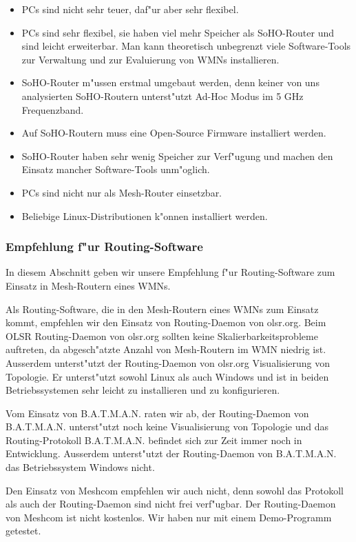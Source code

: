 \begin{itemize}
\item PCs sind nicht sehr teuer, daf"ur aber sehr flexibel.
\item PCs sind sehr flexibel, sie haben viel mehr Speicher als SoHO-Router
und sind leicht erweiterbar. Man kann theoretisch unbegrenzt viele Software-Tools
zur Verwaltung und zur Evaluierung von WMNs installieren.
\item SoHO-Router m"ussen erstmal umgebaut werden, denn keiner von uns
analysierten SoHO-Routern unterst"utzt Ad-Hoc Modus im 5 GHz Frequenzband.
\item Auf SoHO-Routern muss eine Open-Source Firmware installiert werden.
\item SoHO-Router haben sehr wenig Speicher zur Verf"ugung und machen
den Einsatz mancher Software-Tools unm"oglich.
\item PCs sind nicht nur als Mesh-Router einsetzbar.
\item Beliebige Linux-Distributionen k"onnen installiert werden.
\end{itemize}

\subsubsection{Empfehlung f"ur Routing-Software}

In diesem Abschnitt geben wir unsere Empfehlung f"ur Routing-Software
zum Einsatz in Mesh-Routern eines WMNs.

Als Routing-Software, die in den Mesh-Routern eines WMNs zum Einsatz kommt,
empfehlen wir den Einsatz von Routing-Daemon von olsr.org. Beim OLSR
Routing-Daemon von olsr.org sollten keine Skalierbarkeitsprobleme auftreten,
da abgesch"atzte Anzahl von Mesh-Routern im WMN niedrig ist. Ausserdem
unterst"utzt der Routing-Daemon von olsr.org Visualisierung von Topologie.
Er unterst"utzt sowohl Linux als auch Windows und ist in beiden
Betriebssystemen sehr leicht zu installieren und zu konfigurieren.

Vom Einsatz von B.A.T.M.A.N. raten wir ab, der Routing-Daemon von
B.A.T.M.A.N. unterst"utzt noch keine Visualisierung von Topologie
und das Routing-Protokoll B.A.T.M.A.N.  befindet sich zur Zeit immer
noch in Entwicklung.  Ausserdem unterst"utzt der Routing-Daemon von
B.A.T.M.A.N. das Betriebssystem Windows nicht.

Den Einsatz von Meshcom empfehlen wir auch nicht, denn sowohl das
Protokoll als auch der Routing-Daemon sind nicht frei verf"ugbar.
Der Routing-Daemon von Meshcom ist nicht kostenlos. Wir haben nur mit
einem Demo-Programm getestet.

